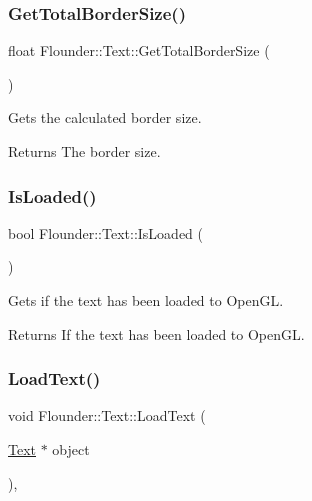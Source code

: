 \subsubsection{\texorpdfstring{Get\+Total\+Border\+Size()}{GetTotalBorderSize()}}
{\footnotesize\ttfamily float Flounder\+::\+Text\+::\+Get\+Total\+Border\+Size (\begin{DoxyParamCaption}{ }\end{DoxyParamCaption})}



Gets the calculated border size. 

\begin{DoxyReturn}{Returns}
The border size. 
\end{DoxyReturn}
\mbox{\label{class_flounder_1_1_text_aa4d02bdfca1c5139fd30761065657f9b}} 
\subsubsection{\texorpdfstring{Is\+Loaded()}{IsLoaded()}}
{\footnotesize\ttfamily bool Flounder\+::\+Text\+::\+Is\+Loaded (\begin{DoxyParamCaption}{ }\end{DoxyParamCaption})}



Gets if the text has been loaded to Open\+GL. 

\begin{DoxyReturn}{Returns}
If the text has been loaded to Open\+GL. 
\end{DoxyReturn}
\mbox{\label{class_flounder_1_1_text_a46ac3dfca95a9c97686b1a71b6795177}} 
\subsubsection{\texorpdfstring{Load\+Text()}{LoadText()}}
{\footnotesize\ttfamily void Flounder\+::\+Text\+::\+Load\+Text (\begin{DoxyParamCaption}\item[{\hyperlink{class_flounder_1_1_text}{Text} $\ast$}]{object }\end{DoxyParamCaption})\hspace{0.3cm}{\ttfamily [static]}, {\ttfamily [private]}}



